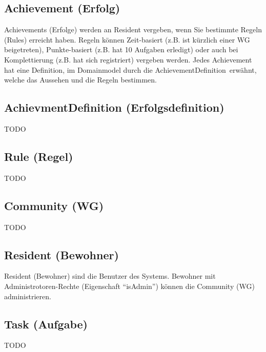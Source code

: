 \subsection*{Achievement (Erfolg)}
Achievements (Erfolge) werden an Resident vergeben, wenn Sie bestimmte Regeln (Rules) erreicht haben. Regeln können Zeit-basiert (z.B. ist kürzlich einer WG beigetreten), Punkte-basiert (z.B. hat 10 Aufgaben erledigt) oder auch bei Komplettierung (z.B. hat sich registriert) vergeben werden.
Jedes Achievement hat eine Definition, im Domainmodel durch die \flqq AchievementDefinition\frqq\ erwähnt, welche das Aussehen und die Regeln bestimmen.

\subsection*{AchievmentDefinition (Erfolgsdefinition)}
TODO

\subsection*{Rule (Regel)}
TODO

\subsection*{Community (WG)}
TODO

\subsection*{Resident (Bewohner)}
Resident (Bewohner) sind die Benutzer des Systems. Bewohner mit Administrotoren-Rechte (Eigenschaft ``isAdmin'') können die Community (WG) administrieren.

\subsection*{Task (Aufgabe)}
TODO
